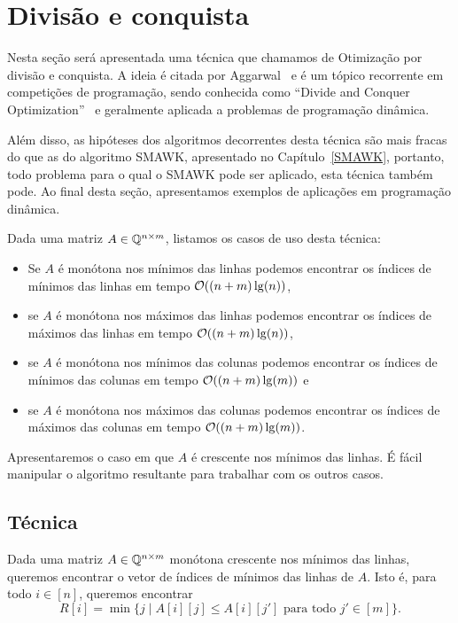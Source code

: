 \chapter{Divisão e conquista}
\label{DivConq}


Nesta seção será apresentada uma técnica que chamamos de Otimização por divisão e conquista. A ideia é citada por Aggarwal~\cite{Aggarwal:1987} e é um tópico recorrente em competições de programação, sendo conhecida como ``Divide and Conquer Optimization''~\cite{Quora:DivConq,CF:Optm} e geralmente aplicada a problemas de programação dinâmica. 

Além disso, as hipóteses dos algoritmos decorrentes desta técnica são mais fracas do que as do algoritmo SMAWK, apresentado no Capítulo~\ref{SMAWK}, portanto, todo problema para o qual o SMAWK pode ser aplicado, esta técnica também pode. Ao final desta seção, apresentamos exemplos de aplicações em programação dinâmica.  

Dada uma matriz $A \in \mathbb{Q}^{n \times m}$, listamos os casos de uso desta técnica:
\begin{itemize}
    \item Se $A$ é monótona nos mínimos das linhas podemos encontrar os índices de mínimos das linhas em tempo $\mathcal{O}((n+m)\lg(n))$, 
    \item se $A$ é monótona nos máximos das linhas podemos encontrar os índices de máximos das linhas em tempo $\mathcal{O}((n+m)\lg(n))$, 
    \item se $A$ é monótona nos mínimos das colunas podemos encontrar os índices de mínimos das colunas em tempo $\mathcal{O}((n+m)\lg(m))$ e 
    \item se $A$ é monótona nos máximos das colunas podemos encontrar os índices de máximos das colunas em tempo $\mathcal{O}((n+m)\lg(m))$.
\end{itemize}

Apresentaremos o caso em que $A$ é crescente nos mínimos das linhas. É fácil manipular o algoritmo resultante para trabalhar com os outros casos.


\section{Técnica}
Dada uma matriz $A \in \mathbb{Q}^{n \times m}$ monótona crescente nos mínimos das linhas, queremos encontrar o vetor de índices de mínimos das linhas de $A$. Isto é, para todo $i \in [n]$, queremos encontrar
$$ R[i] = \min\{j \mid A[i][j] \leq A[i][j'] \text{ para todo } j' \in [m]\} \text{.}$$  

